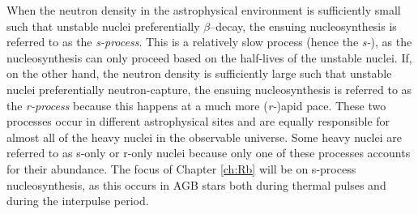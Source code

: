 
When the neutron density in the astrophysical environment is sufficiently small such that unstable nuclei preferentially $\beta$--decay, the ensuing nucleosynthesis is referred to as the \emph{s-process}. This is a relatively slow process (hence the \emph{s-}), as the nucleosynthesis can only proceed based on the half-lives of the unstable nuclei. If, on the other hand, the neutron density is sufficiently large such that unstable nuclei preferentially neutron-capture, the ensuing nucleosynthesis is referred to as the \emph{r-process} because this happens at a much more (\emph{r-})apid pace. These two processes occur in different astrophysical sites and are equally responsible for almost all of the heavy nuclei in the observable universe. Some heavy nuclei are referred to as s-only or r-only nuclei because only one of these processes accounts for their abundance. The focus of Chapter \ref{ch:Rb} will be on s-process nucleosynthesis, as this occurs in AGB stars both during thermal pulses and during the interpulse period.


